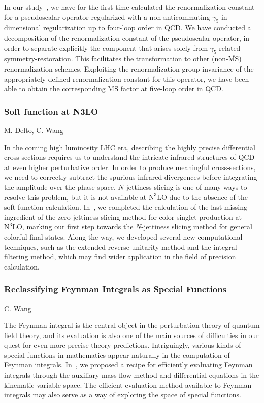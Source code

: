 \documentclass{FBR_Bericht_2025}
\begin{document}
\begin{refsection}
In our study~\cite{Chen:2024cvu}, we have for the first time calculated the renormalization constant for a pseudoscalar operator regularized with a non-anticommuting $\gamma_5$ in dimensional regularization up to four-loop order in QCD. We have conducted a decomposition of the renormalization constant of the pseudoscalar operator, in order to separate explicitly the component that arises solely from $\gamma_5$-related symmetry-restoration. This facilitates the transformation to other (non-$\overline{\mathrm{MS}}$) renormalization schemes. Exploiting the renormalization-group invariance of the appropriately defined renormalization constant for this operator, we have been able to obtain the corresponding $\overline{\mathrm{MS}}$ factor at five-loop order in QCD. 
%
\subsubsection{Soft function at N3LO}
\begin{Namen}
M. Delto, C. Wang
\end{Namen}
%
In the coming high luminosity LHC era, describing the highly precise differential cross-sections requires us to understand the intricate infrared structures of QCD at even higher perturbative order.
In order to produce meaningful cross-sections, we need to correctly subtract the spurious infrared divergences before integrating the amplitude over the phase space.
$N$-jettiness slicing is one of many ways to resolve this problem, but it is not available at $\text{N}^{3}\text{LO}$ due to the absence of the soft function calculation.
In~\cite{Baranowski:2024ene,Baranowski:2024vxg,Baranowski:2024ysi}, we completed the calculation of the last missing ingredient of the zero-jettiness slicing method for color-singlet production at $\text{N}^{3}\text{LO}$, marking our first step towards the $N$-jettiness slicing method for general colorful final states.
Along the way, we developed several new computational techniques, such as the extended reverse unitarity method and the integral filtering method, which may find wider application in the field of precision calculation.
%
\subsubsection{Reclassifying Feynman Integrals as Special Functions}
\begin{Namen}
C. Wang
\end{Namen}
%
The Feynman integral is the central object in the perturbation theory of quantum field theory, and its evaluation is also one of the main sources of difficulties in our quest for even more precise theory predictions.
Intriguingly, various kinds of special functions in mathematics appear naturally in the computation of Feynman integrals.
In~\cite{Liu:2023jkr}, we proposed a recipe for efficiently evaluating Feynman integrals through the auxiliary mass flow method and differential equations in the kinematic variable space.
The efficient evaluation method available to Feynman integrals may also serve as a way of exploring the space of special functions.
%
%

\end{refsection}
\end{document}
